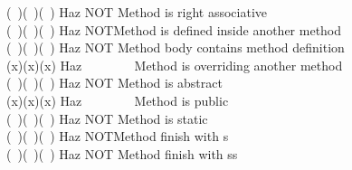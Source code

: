 \documentclass[12pt]{article}
\begin{document}
{(\ )(\ )(\ ) \>Haz NOT               \> Method is right associative\\
(\ )(\ )(\ ) \>Haz NOT\>Method is defined inside another method\\
(\ )(\ )(\ ) \>Haz NOT               \> Method body contains method definition\\
(x)(x)(x) \>Haz  \ \ \ \ \ \ \           \>        Method is overriding another method\\
(\ )(\ )(\ ) \>Haz NOT        \>       Method is abstract\\
(x)(x)(x) \>Haz  \ \ \ \ \ \ \            \>        Method is public\\
(\ )(\ )(\ ) \>Haz NOT             \>   Method is static\\
(\ )(\ )(\ ) \>Haz NOT\>Method finish with s\\
(\ )(\ )(\ ) \>Haz NOT           \>     Method finish with ss}


\newpage



\end{document}
